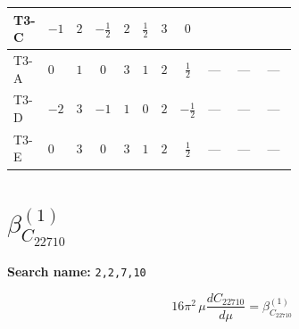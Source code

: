 \documentclass[8pt]{article}
\begin{document}
\begin{landscape}
\begin{longtable}{@{}llcccccc >{\raggedright\arraybackslash}p{0.21\linewidth} >{\raggedright\arraybackslash}p{0.21\linewidth} >{\raggedright\arraybackslash}p{0.21\linewidth}@{}}
T3-C & $-1$ & $2$ & $-\frac{1}{2}$ & $2$ & $\frac{1}{2}$ & $3$ & $0$ & \scriptsize\adjustbox{max width=\linewidth}{$\begin{gathered} - \frac{lambda12Inv2 \overline{y_{1}} \overline{y_{2}}}{3 MF}\end{gathered}$} & \scriptsize\adjustbox{max width=\linewidth}{$\begin{gathered} - \frac{\sqrt{3} g_{2}^{2} \overline{y_{1}} \overline{y_{2}}}{4 MF}\end{gathered}$} & \scriptsize\adjustbox{max width=\linewidth}{$\begin{gathered} \frac{\sqrt{3} ye \overline{y_{1}} \overline{y_{2}} \overline{ye}}{12 MF}\end{gathered}$} \\
\midrule
T3-A & $0$ & $1$ & $0$ & $3$ & $1$ & $2$ & $\frac{1}{2}$ & --- & --- & --- \\
\midrule
T3-D & $-2$ & $3$ & $-1$ & $1$ & $0$ & $2$ & $-\frac{1}{2}$ & --- & --- & --- \\
\midrule
T3-E & $0$ & $3$ & $0$ & $3$ & $1$ & $2$ & $\frac{1}{2}$ & --- & --- & --- \\
\midrule
\bottomrule
\end{longtable}
\clearpage
\section*{$\beta_{C_{22710}}^{(1)}$}
\noindent\textbf{Search name: }\texttt{2,2,7,10}\par\smallskip
\[16\pi^2\,\mu\frac{d C_{22710}}{d\mu}=\beta_{C_{22710}}^{(1)}\]

\end{landscape}
\end{document}
